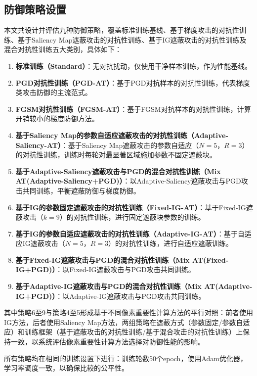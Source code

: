 \subsection{防御策略设置}

本文共设计并评估九种防御策略，覆盖标准训练基线、基于梯度攻击的对抗性训练、基于Saliency Map遮蔽攻击的对抗性训练、基于IG遮蔽攻击的对抗性训练及混合对抗性训练五大类别，具体如下：

\begin{enumerate}
  \item \textbf{标准训练（Standard）}：无对抗扰动，仅使用干净样本训练，作为性能基线。
  \item \textbf{PGD对抗性训练（PGD-AT）}：基于PGD对抗样本的对抗性训练\cite{madry2018pgd}，代表梯度类攻击防御的主流范式。
  \item \textbf{FGSM对抗性训练（FGSM-AT）}：基于FGSM对抗样本的对抗性训练\cite{goodfellow2015fgsm}，计算开销较小的梯度防御方法。
  \item \textbf{基于Saliency Map的参数自适应遮蔽攻击的对抗性训练（Adaptive-Saliency-AT）}：基于Saliency Map遮蔽攻击的参数自适应（$N=5$，$R=3$）的对抗性训练，训练时每轮对最显著区域施加参数不固定遮蔽块。
  \item \textbf{基于Adaptive-Saliency遮蔽攻击与PGD的混合对抗性训练（Mix AT(Adaptive-Saliency+PGD)）}：以Adaptive-Saliency遮蔽攻击与PGD攻击共同训练，平衡遮蔽防御与梯度防御。
  \item \textbf{基于IG的参数固定遮蔽攻击的对抗性训练（Fixed-IG-AT）}：基于Fixed-IG遮蔽攻击（$k=9$）的对抗性训练，进行固定遮蔽块参数的训练。
  \item \textbf{基于IG的参数自适应遮蔽攻击的对抗性训练（Adaptive-IG-AT）}：基于自适应IG遮蔽攻击（$N=5$，$R=3$）的对抗性训练，进行自适应遮蔽训练。
  \item \textbf{基于Fixed-IG遮蔽攻击与PGD的混合对抗性训练（Mix AT(Fixed-IG+PGD)）}：以Fixed-IG遮蔽攻击与PGD攻击共同训练。
  \item \textbf{基于Adaptive-IG遮蔽攻击与PGD的混合对抗性训练（Mix AT(Adaptive-IG+PGD)）}：以Adaptive-IG遮蔽攻击与PGD攻击共同训练。
\end{enumerate}

其中策略6至9与策略4至5形成基于不同像素重要性计算方法的平行对照：前者使用IG方法，后者使用Saliency Map方法，两组策略在遮蔽方式（参数固定/参数自适应）和训练框架（基于遮蔽攻击的对抗性训练/基于混合攻击的对抗性训练）上保持一致，以系统评估像素重要性计算方法选择对防御性能的影响。

所有策略均在相同的训练设置下进行：训练轮数50个epoch，使用Adam优化器\cite{kingma2015adam}，学习率调度一致，以确保比较的公平性。

